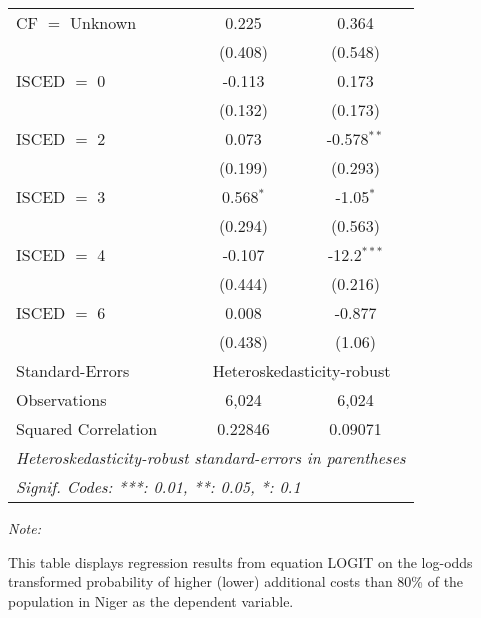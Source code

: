 \begin{table}[htbp!]
\begin{adjustbox}{width = 1\textwidth, max height = 0.95\textheight, center}
\begin{threeparttable}[b]
\begin{tabular}{lcc}
            CF $=$ Unknown       & 0.225         & 0.364\\   
                                 & (0.408)       & (0.548)\\   
            ISCED $=$ 0          & -0.113        & 0.173\\   
                                 & (0.132)       & (0.173)\\   
            ISCED $=$ 2          & 0.073         & -0.578$^{**}$\\   
                                 & (0.199)       & (0.293)\\   
            ISCED $=$ 3          & 0.568$^{*}$   & -1.05$^{*}$\\   
                                 & (0.294)       & (0.563)\\   
            ISCED $=$ 4          & -0.107        & -12.2$^{***}$\\   
                                 & (0.444)       & (0.216)\\   
            ISCED $=$ 6          & 0.008         & -0.877\\   
                                 & (0.438)       & (1.06)\\   
            \midrule 
            Standard-Errors & \multicolumn{2}{c}{Heteroskedasticity-robust} \\ 
            Observations         & 6,024         & 6,024\\  
            Squared Correlation  & 0.22846       & 0.09071\\  
            \midrule \midrule
            \multicolumn{3}{l}{\emph{Heteroskedasticity-robust standard-errors in parentheses}}\\
            \multicolumn{3}{l}{\emph{Signif. Codes: ***: 0.01, **: 0.05, *: 0.1}}\\
         \end{tabular}
         
         \begin{tablenotes}\item \medskip \textit{Note:}
            \item This table displays regression results from equation LOGIT on the log-odds transformed probability of higher (lower) additional costs than 80\% of the population in Niger as the dependent variable. 
         \end{tablenotes}
      \end{threeparttable}
   \end{adjustbox}
\end{table}


